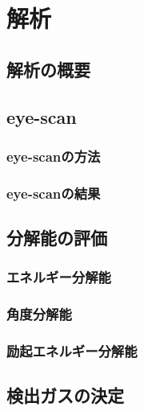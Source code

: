 \chapter{解析}
%
%
%
\section{解析の概要}

\section{eye-scan}
\subsection{eye-scanの方法}
\subsection{eye-scanの結果}

\section{分解能の評価}
\subsection{エネルギー分解能}
\subsection{角度分解能}
\subsection{励起エネルギー分解能}

\section{検出ガスの決定}
